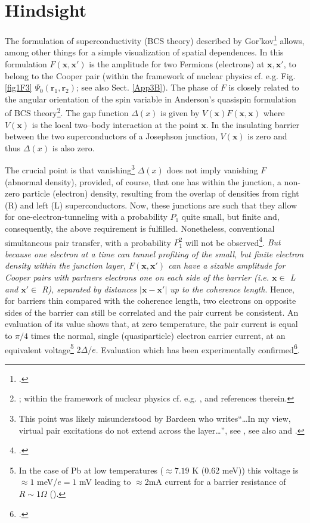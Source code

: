 \section{Hindsight}\label{C3AppE}
The formulation of superconductivity (BCS theory) described by Gor'kov\footnote{\cite{Gorkov:58,Gorkov:59}.} allows, among other things for a simple visualization of spatial dependences. In this formulation $F(\mathbf{x},\mathbf{x}')$ is the amplitude for two Fermions (electrons) at $\mathbf{x},\mathbf{x}'$, to belong to the Cooper pair (within the framework of nuclear physics cf. e.g. Fig. \ref{fig1F3} $\Psi_0(\mathbf{r}_1,\mathbf{r}_2)$; see also Sect. \ref{App3B}). The phase of $F$ is closely  related to the angular orientation of the spin variable  in Anderson's quasispin formulation of BCS theory\footnote{\cite{Anderson:58b}; within the framework of nuclear physics cf. e.g. \cite{Bohr:88}, \cite{Potel:13b} and references therein.}. The gap function $\Delta(x)$ is given by $V(\mathbf{x})F(\mathbf{x},\mathbf{x})$ where $V(\mathbf{x})$ is the local two--body interaction at the point $\mathbf x$. In the insulating barrier between the two superconductors of a Josephson junction, $V(\mathbf{x})$ is zero and thus $\Delta(x)$ is also zero. 



The crucial point is that vanishing\footnote{This point was likely misunderstood by Bardeen who writes``\dots In my view, virtual pair excitations do not extend across the layer\dots'', see \cite{McDonald:01}, see also \cite{Bardeen:61} and \cite{Bardeen:62}.} $\Delta(x)$ does not imply vanishing $F$ (abnormal density), provided, of course, that one has within the junction, a non-zero particle (electron) density, resulting from the overlap of densities from right (R) and left (L) superconductors. Now, these junctions are such that they allow for one-electron-tunneling with a probability $P_1$ quite small, but finite  and, consequently, the above requirement is fulfilled. Nonetheless, conventional  simultaneous pair transfer, with a probability $P_1^2$ will not be observed\footnote{\cite{Pippard:12}.}. \textit{But because one electron at a time can tunnel profiting of the small, but finite electron density within the junction layer,   $F(\mathbf{x},\mathbf{x}')$ can have a sizable amplitude for Cooper pairs with partners electrons one on each side of the barrier (i.e. $\mathbf x\in$ L and $\mathbf x'\in$ R), separated by distances $|\mathbf{x}-\mathbf{x}'|$ up to the coherence length}. Hence, for barriers  thin compared with the coherence length, two electrons on opposite sides of the barrier can still be correlated and the pair current   be consistent. An evaluation of its 
value shows that, at zero temperature, the pair current is equal to $\pi/4$ times the normal, single (quasiparticle) electron carrier current, at an equivalent voltage\footnote{In the case of Pb at low temperatures ($\approx7.19$ K (0.62 meV)) this voltage is $\approx 1$ meV/$e=1$ mV leading to $\approx$2mA current for a barrier resistance of $R\sim1\Omega$ (\cite{Ambegaokar:63,McDonald:01,Tinkham:96}).} $2\Delta/e$.
Evaluation which has been experimentally confirmed\footnote{\cite{Rogalla:12}.}.

